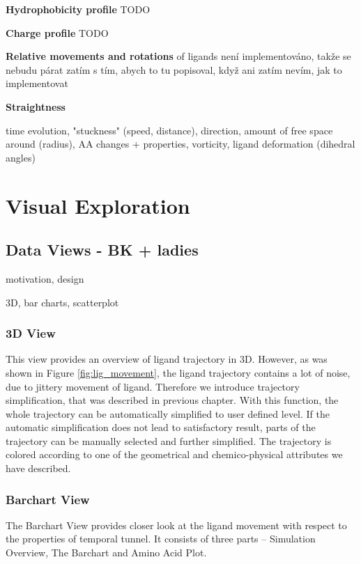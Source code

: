 \documentclass[twocolumn]{bmcart}%
\begin{document}
\begin{itemize}
\item{\textbf{Hydrophobicity profile}} {\color{red}TODO}

\item{\textbf{Charge profile}} {\color{red}TODO}

{\color{red}\item \textbf{Relative movements and rotations} of ligands není implementováno, takže se nebudu párat zatím s tím, abych to tu popisoval, když ani zatím nevím, jak to implementovat} 

\item \textbf{Straightness} 

\end{itemize}


time evolution, "stuckness" (speed, distance), direction, amount of free space around (radius), AA changes + properties, vorticity, ligand deformation (dihedral angles)

\section*{Visual Exploration}
\subsection*{Data Views - BK + ladies}
motivation, design

3D, bar charts, scatterplot

\subsubsection*{3D View}
This view provides an overview of ligand trajectory in 3D.
However, as was shown in Figure \ref{fig:lig_movement}, the ligand trajectory contains a lot of noise, due to jittery movement of ligand.
Therefore we introduce trajectory simplification, that was described in previous chapter.
With this function, the whole trajectory can be automatically simplified to user defined level.
If the automatic simplification does not lead to satisfactory result, parts of the trajectory can be manually selected and further simplified.
The trajectory is colored according to one of the geometrical and chemico-physical attributes we have described. 

\subsubsection*{Barchart View}
The Barchart View provides closer look at the ligand movement with respect to the properties of temporal tunnel.
It consists of three parts -- Simulation Overview, The Barchart and Amino Acid Plot.
\end{document}
